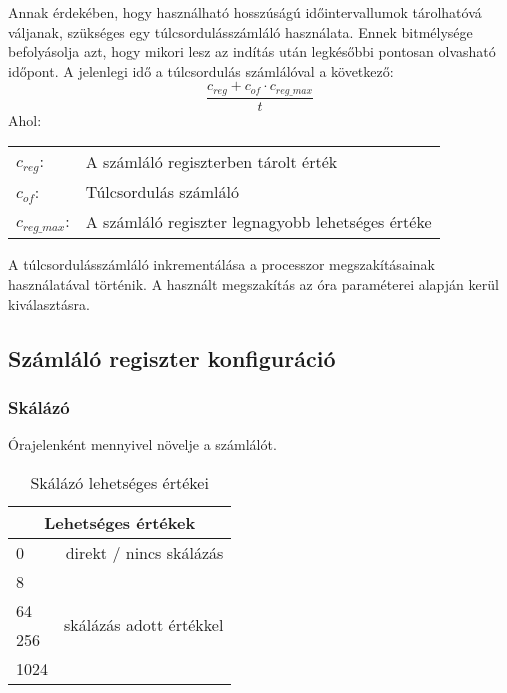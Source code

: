 Annak érdekében, hogy használható hosszúságú időintervallumok tárolhatóvá váljanak, szükséges egy túlcsordulásszámláló használata.
Ennek bitmélysége befolyásolja azt, hogy mikori lesz az indítás után legkésőbbi pontosan olvasható időpont.
A jelenlegi idő a túlcsordulás számlálóval a következő:
\begin{equation}
    \frac{c_{reg} + c_{of} \cdot c_{reg\_max}}{t}
    \label{eq:ido_szamlalokbol}
\end{equation}
Ahol:
\captionsetup[table]{list=no}
\begin{table}[H]
    \begin{tabular}{ll}
    $c_{reg}$:&A számláló regiszterben tárolt érték \\
    $c_{of}$:&Túlcsordulás számláló \\
    $c_{reg\_max}$:&A számláló regiszter legnagyobb lehetséges értéke \\
    \end{tabular}
\end{table}
\captionsetup[table]{list=yes}
A túlcsordulásszámláló inkrementálása a processzor megszakításainak használatával történik.
A használt megszakítás az óra paraméterei alapján kerül kiválasztásra.

\subsection{Számláló regiszter konfiguráció}

\subsubsection*{Skálázó} Órajelenként mennyivel növelje a számlálót.
\begin{table}[H]
    \centering
    \begin{tabular}{|lr|}
    \toprule
    \multicolumn{2}{|c|}{Lehetséges értékek}                              \\ \midrule
    \multicolumn{1}{|l|}{0}    & direkt / nincs skálázás                  \\ \midrule
    \multicolumn{1}{|l|}{8}    & \multirow{4}{*}{skálázás adott értékkel} \\ \cmidrule(r){1-1}
    \multicolumn{1}{|l|}{64}   &                                          \\ \cmidrule(r){1-1}
    \multicolumn{1}{|l|}{256}  &                                          \\ \cmidrule(r){1-1}
    \multicolumn{1}{|l|}{1024} &                                          \\ \bottomrule
    \end{tabular}
    \caption{Skálázó lehetséges értékei}
    \label{tab:skalazo_ertekek}
\end{table}

